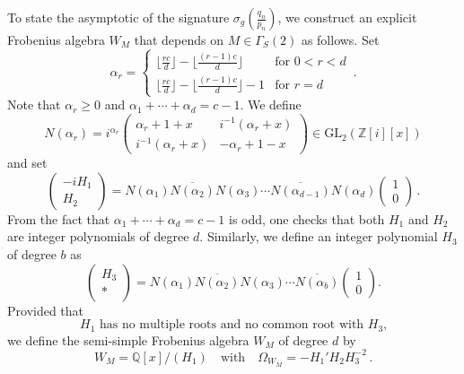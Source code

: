 \documentclass{amsart}
\newcommand{\Q}{\mathbb{Q}}
\newcommand{\Z}{\mathbb{Z}}
\theoremstyle{definition}
\begin{document}
To state the asymptotic of the signature $\sigma_g(\frac{q_n}{p_n})$, we construct an explicit Frobenius algebra $W_M$ that depends on $M \in \Gamma_S(2)$ as follows. Set
\begin{equation}
\label{eqn.alpha}
    \alpha_r = 
    \begin{cases}
        \lfloor \frac{rc}{d}\rfloor-\lfloor \frac{(r-1)c}{d}\rfloor & \text{for } 0 < r <d \\[2pt]
        \lfloor \frac{rc}{d}\rfloor-\lfloor \frac{(r-1)c}{d}\rfloor-1 & \text{for } r= d
    \end{cases} \,.
\end{equation}
Note that $\alpha_r \geq 0$ and  $\alpha_1 + \cdots +\alpha_d=c-1$. We define
$$N(\alpha_r)=i^{\alpha_r}\begin{pmatrix} \alpha_r+1+x & i^{-1}(\alpha_r +x)\\ i^{-1}(\alpha_r +x) & -\alpha_r+1-x\end{pmatrix} \in \mathrm{GL}_2(\Z[i][x])$$
and set 
$$\begin{pmatrix} -iH_1 \\ H_2 \end{pmatrix}=N(\alpha_1)\overline{N(\alpha_2)}N(\alpha_3)\cdots \overline{N(\alpha_{d-1})}N(\alpha_d)\begin{pmatrix} 1 \\0 \end{pmatrix}\,.$$
From the fact that $\alpha_1 + \cdots +\alpha_d = c-1$ is odd, one checks that both $H_1$ and $H_2$ are integer polynomials of degree $d$.
Similarly, we define an integer polynomial $H_3$ of degree $b$ as 
$$\begin{pmatrix}
    H_3 \\ * 
\end{pmatrix}=N(\alpha_1)\overline{N(\alpha_2)}N(\alpha_3)\cdots \overline{N(\alpha_{b})}\begin{pmatrix}1 \\ 0\end{pmatrix}.$$
Provided that
\begin{equation}
\text{$H_1$ has no multiple roots and no common root with $H_3$,}
\tag{H}\label{cond:H}
\end{equation}
we define the semi-simple Frobenius algebra $W_M$ of degree $d$ by
\begin{equation*}
    W_M=\Q[x]/(H_1) \quad \text{with} \quad \Omega_{W_M}=-H_1'H_2 H_3^{-2}\,.
\end{equation*} 
\end{document}
